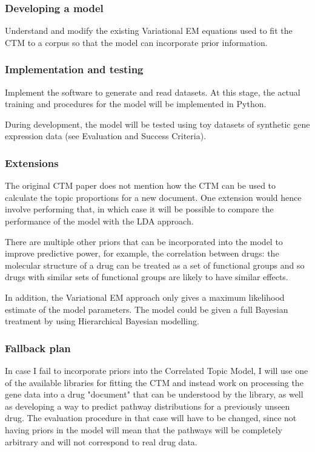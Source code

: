 \documentclass[12pt,a4]{article}
\begin{document}
\subsubsection*{Developing a model}

Understand and modify the existing Variational EM equations used to fit the CTM to a corpus so that the model can incorporate prior information.

\subsubsection*{Implementation and testing}

Implement the software to generate and read datasets. At this stage, the actual training and procedures for the model will be implemented in Python.

During development, the model will be tested using toy datasets of synthetic gene expression data (see Evaluation and Success Criteria).

\subsubsection*{Extensions}
The original CTM paper does not mention how the CTM can be used to calculate the topic proportions for a new document. One extension would hence involve performing that, in which case it will be possible to compare the performance of the model with the LDA approach.

There are multiple other priors that can be incorporated into the model to improve predictive power, for example, the correlation between drugs: the molecular structure of a drug can be treated as a set of functional groups and so drugs with similar sets of functional groups are likely to have similar effects.

In addition, the Variational EM approach only gives a maximum likelihood estimate of the model parameters. The model could be given a full Bayesian treatment by using Hierarchical Bayesian modelling.

\subsubsection*{Fallback plan}
In case I fail to incorporate priors into the Correlated Topic Model, I will use one of the available libraries for fitting the CTM and instead work on processing the gene data into a drug "document" that can be understood by the library, as well as developing a way to predict pathway distributions for a previously unseen drug. The evaluation procedure in that case will have to be changed, since not having priors in the model will mean that the pathways will be completely arbitrary and will not correspond to real drug data.
\end{document}
